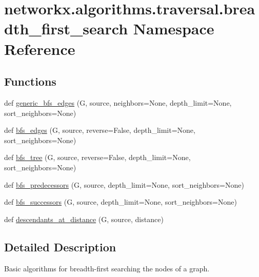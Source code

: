 \hypertarget{namespacenetworkx_1_1algorithms_1_1traversal_1_1breadth__first__search}{}\section{networkx.\+algorithms.\+traversal.\+breadth\+\_\+first\+\_\+search Namespace Reference}
\label{namespacenetworkx_1_1algorithms_1_1traversal_1_1breadth__first__search}
\subsection*{Functions}
\begin{DoxyCompactItemize}
\item 
def \hyperlink{namespacenetworkx_1_1algorithms_1_1traversal_1_1breadth__first__search_a548d3ed070b97572b2ea3c4b88b2488d}{generic\+\_\+bfs\+\_\+edges} (G, source, neighbors=None, depth\+\_\+limit=None, sort\+\_\+neighbors=None)
\item 
def \hyperlink{namespacenetworkx_1_1algorithms_1_1traversal_1_1breadth__first__search_aa5af1205d736c12d3289220fea888516}{bfs\+\_\+edges} (G, source, reverse=False, depth\+\_\+limit=None, sort\+\_\+neighbors=None)
\item 
def \hyperlink{namespacenetworkx_1_1algorithms_1_1traversal_1_1breadth__first__search_aaa1a2a391779d78cc1c41745996d3aa3}{bfs\+\_\+tree} (G, source, reverse=False, depth\+\_\+limit=None, sort\+\_\+neighbors=None)
\item 
def \hyperlink{namespacenetworkx_1_1algorithms_1_1traversal_1_1breadth__first__search_aa325f7b07032f06521bf1ba67b2393bd}{bfs\+\_\+predecessors} (G, source, depth\+\_\+limit=None, sort\+\_\+neighbors=None)
\item 
def \hyperlink{namespacenetworkx_1_1algorithms_1_1traversal_1_1breadth__first__search_a15e4b195f02a35fe3145e21d140ccee7}{bfs\+\_\+successors} (G, source, depth\+\_\+limit=None, sort\+\_\+neighbors=None)
\item 
def \hyperlink{namespacenetworkx_1_1algorithms_1_1traversal_1_1breadth__first__search_a4f27fb79b259e1555e260dcc1df85743}{descendants\+\_\+at\+\_\+distance} (G, source, distance)
\end{DoxyCompactItemize}


\subsection{Detailed Description}
\begin{DoxyVerb}Basic algorithms for breadth-first searching the nodes of a graph.\end{DoxyVerb}
 

